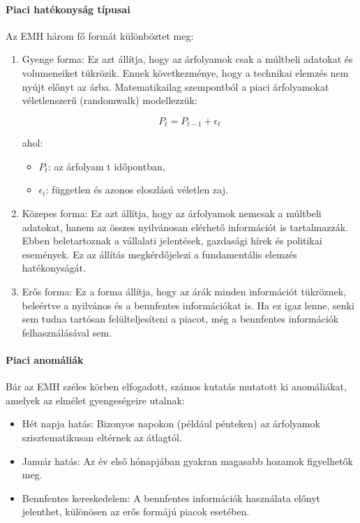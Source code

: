 \documentclass[11pt]{article}
\providecommand{\tightlist}{%
      \setlength{\itemsep}{0pt}\setlength{\parskip}{0pt}}
\begin{document}
\paragraph{Piaci hatékonyság
típusai}\label{piaci-hatuxe9konysuxe1g-tuxedpusai}

Az EMH három fő formát különböztet meg:

\begin{enumerate}
\def\labelenumi{\arabic{enumi}.}
\item
  Gyenge forma: Ez azt állítja, hogy az árfolyamok csak a múltbeli
  adatokat és volumeneiket tükrözik. Ennek következménye, hogy a
  technikai elemzés nem nyújt előnyt az árba. Matematikailag szempontból
  a piaci árfolyamokat véletlenszerű (randomwalk) modellezzük:

  \[P_t = P_{t-1} + \epsilon_t\]

  ahol:

  \begin{itemize}
  \tightlist
  \item
    \(P_t\): az árfolyam t időpontban,
  \item
    \(\epsilon_t\): független és azonos eloszlású véletlen zaj.
  \end{itemize}
\item
  Közepes forma: Ez azt állítja, hogy az árfolyamok nemcsak a múltbeli
  adatokat, hanem az összes nyilvánosan elérhető információt is
  tartalmazzák. Ebben beletartoznak a vállalati jelentések, gazdasági
  hírek és politikai események. Ez az állítás megkérdőjelezi a
  fundamentális elemzés hatékonyságát.
\item
  Erős forma: Ez a forma állítja, hogy az árák minden információt
  tükröznek, beleértve a nyilvános és a bennfentes információkat is. Ha
  ez igaz lenne, senki sem tudna tartósan felülteljesíteni a piacot, még
  a bennfentes információk felhasználásával sem.
\end{enumerate}

\paragraph{Piaci anomáliák}\label{piaci-anomuxe1liuxe1k}

Bár az EMH széles körben elfogadott, számos kutatás mutatott ki
anomáliákat, amelyek az elmélet gyengeségeire utalnak:

\begin{itemize}
\tightlist
\item
  Hét napja hatás: Bizonyos napokon (például pénteken) az árfolyamok
  szisztematikusan eltérnek az átlagtól.
\item
  Január hatás: Az év első hónapjában gyakran magasabb hozamok
  figyelhetők meg.
\item
  Bennfentes kereskedelem: A bennfentes információk használata előnyt
  jelenthet, különösen az erős formájú piacok esetében.
\end{itemize}
\end{document}
